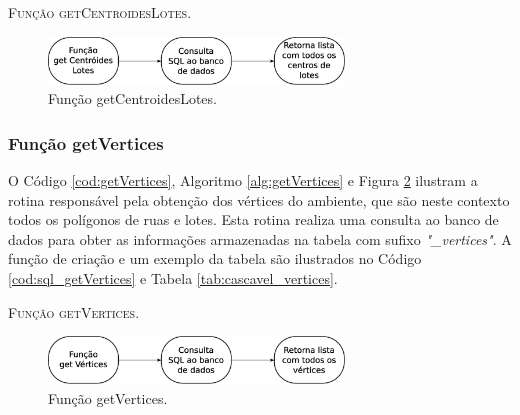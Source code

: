 \begin{algorithm}[H]
   \SetAlgoLined   
   
   \caption{\textsc{Função getCentroidesLotes.}}
   \label{alg:getCentroidesLotes}
\end{algorithm}

\begin{figure}[H]
  \centering
  \includegraphics[width=0.7\textwidth]{Figuras/Simula/Fluxos/getCentroidesLotes.eps}
  \caption{Função getCentroidesLotes.}
  \label{fig:getCentroidesLotes}
\end{figure} 

\newpage

\subsubsection{Função getVertices}

O Código \ref{cod:getVertices}, Algoritmo \ref{alg:getVertices} e Figura \ref{fig:getVertices} ilustram a rotina responsável pela obtenção dos vértices do ambiente, que são neste contexto todos os polígonos de ruas e lotes. Esta rotina realiza uma consulta ao banco de dados para obter as informações armazenadas na tabela com sufixo \textit{"\_vertices"}. A função de criação e um exemplo da tabela são ilustrados no Código \ref{cod:sql_getVertices} e Tabela \ref{tab:cascavel_vertices}. 



\begin{algorithm}[H]
   \SetAlgoLined   
   
   \caption{\textsc{Função getVertices.}}
   \label{alg:getVertices}
\end{algorithm}

\begin{figure}[H]
  \centering
  \includegraphics[width=0.7\textwidth]{Figuras/Simula/Fluxos/getVertices.eps}
  \caption{Função getVertices.}
  \label{fig:getVertices}
\end{figure} 

